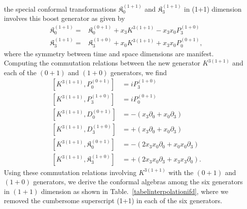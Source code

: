\documentclass[%
 reprint,
superscriptaddress,
 amsmath,amssymb,
 aps,
]{revtex4-2}
\begin{document}
the special conformal transformations $\mathfrak{K}^{(1+1)}_{{0}}$
and $\mathfrak{K}^{(1+1)}_{{3}}$ in (1+1) dimension involves this boost generator as given by
\begin{align}
\mathfrak{K}^{(1+1)}_{{0}}=&\mathfrak{K}^{(0+1)}_{{0}}+x_{3}K^{3(1+1)}-x_{3}x_{0}P^{(1+0)}_{3}\\
\mathfrak{K}^{(1+1)}_{{3}}=&\mathfrak{K}^{(1+0)}_{{3}}+x_{0}K^{3(1+1)}+x_{3}x_{0}P^{(0+1)}_{0},
\end{align}
where the symmetry between time and space 
dimensions are manifest.
Computing the commutation relations between the new generator $K^{3(1+1)}$ and each of the $(0+1)$ and $(1+0)$ generators, we find
\begin{align}
    \left[K^{3(1+1)}, P^{(0+1)}_{0}\right] &= iP^{(1+0)}_{3}\\
    \left[K^{3(1+1)}, P^{(1+0)}_{3}\right] &= iP^{(0+1)}_{0}\\
    \left[K^{3(1+1)}, D^{(0+1)}_{0}\right] &=-(x_{3}\partial_{0}+x_{0}\partial_{3})\\
    \left[K^{3(1+1)}, D^{(1+0)}_{3}\right] &=+(x_{3}\partial_{0}+x_{0}\partial_{3})\\
    \left[K^{3(1+1)}, \mathfrak{K}^{(0+1)}_{0}\right] &=-(2x_{3}x_{0}\partial_{0}+x_{0}x_{0}\partial_{3})\\
    \left[K^{3(1+1)}, \mathfrak{K}^{(1+0)}_{3}\right] &=+(2x_{3}x_{0}\partial_{3}+x_{3}x_{3}\partial_{0}).
\end{align}
Using these commutation relations involving $K^{3(1+1)}$ with the $(0+1)$ and $(1+0)$ generators, we derive the conformal algebras among the six generators in $(1+1)$ dimension as shown in Table.~\ref{tabelinterpolationifd}, where we removed the cumbersome superscript (1+1) in each of the six generators. 
\end{document}
